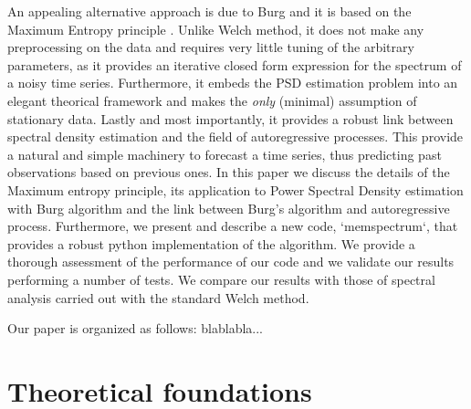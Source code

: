 \documentclass[twocolumn,showpacs,preprintnumbers,nofootinbib,prd,
superscriptaddress,10pt]{revtex4-1}
\begin{document}
\par
An appealing alternative approach is due to Burg \cite{burg1975maximum} and it is based on the Maximum Entropy principle \cite{Jaynes}.
Unlike Welch method, it does not make any preprocessing on the data and requires very little tuning of the arbitrary parameters, as it provides an iterative closed form expression for the spectrum of a noisy time series. Furthermore, it embeds the PSD estimation problem into an elegant theorical framework and makes the \textit{only} (minimal) assumption of stationary data.
Lastly and most importantly, it provides a robust link between spectral density estimation and the field of autoregressive processes. This provide a natural and simple machinery to forecast a time series, thus predicting past observations based on previous ones.
In this paper we discuss the details of the Maximum entropy principle, its application to Power Spectral Density estimation with Burg algorithm and the link between Burg's algorithm and autoregressive process. Furthermore, we present and describe a new code, `memspectrum`, that provides a robust python implementation of the algorithm.
We provide a thorough assessment of the performance of our code and we validate our results performing a number of tests. We compare our results with those of spectral analysis carried out with the standard Welch method.
\par
Our paper is organized as follows: blablabla...


\section{Theoretical foundations}
\end{document}

